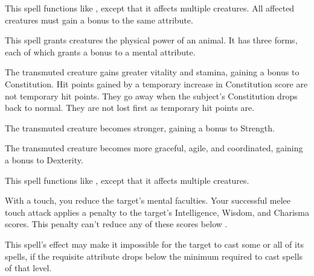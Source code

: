 \spellrng{\rngmed}
\begin{spelleffect}
  This spell functions like , except that it affects multiple creatures. All affected creatures must gain a bonus to the same attribute.
\end{spelleffect}

\spellrng{\rngclose}
\spelldur{\durshort}
\begin{spelleffect}
  This spell grants creatures the physical power of an animal. It has three forms, each of which grants a  bonus to a mental attribute. \bonusscalingdescription
  \par {} The transmuted creature gains greater vitality and stamina, gaining a bonus to Constitution. Hit points gained by a temporary increase in Constitution score are not temporary hit points. They go away when the subject's Constitution drops back to normal. They are not lost first as temporary hit points are.
  \par {} The transmuted creature becomes stronger, gaining a bonus to Strength.
  \par {} The transmuted creature becomes more graceful, agile, and coordinated, gaining a bonus to Dexterity.
\end{spelleffect}

\spellrng{\rngmed}
\begin{spelleffect}
  This spell functions like , except that it affects multiple creatures.
\end{spelleffect}

\spellrng{\rngclose}
\spelldur{\durshort}
\begin{spelleffect}
  With a touch, you reduce the target's mental faculties. Your successful melee touch attack applies a  penalty to the target's Intelligence, Wisdom, and Charisma scores. This penalty can't reduce any of these scores below .
\end{spelleffect}
\begin{spellnotes}
  This spell's effect may make it impossible for the target to cast some or all of its spells, if the requisite attribute drops below the minimum required to cast spells of that level.
\end{spellnotes}

